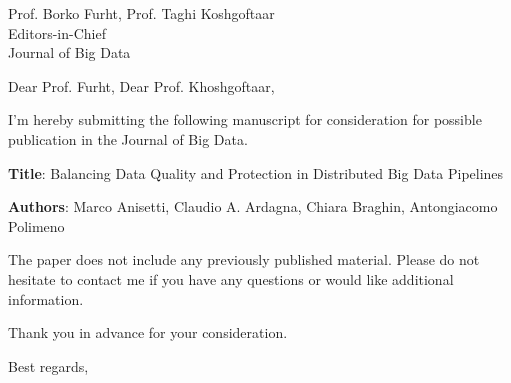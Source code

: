 \documentclass[12pt]{sriletter}
\begin{document}
\signature{\vspace*{-1.4cm}\\
    Claudio Ardagna}

\faxnumber{}

\begin{letter}{%
        Prof. Borko Furht, Prof.  Taghi Koshgoftaar \\
        Editors-in-Chief\\
        Journal of Big Data\\
    }

    \opening{Dear Prof. Furht, Dear Prof. Khoshgoftaar,}

    I'm hereby submitting the following manuscript for consideration for possible publication in the Journal of Big Data.

    \textbf{Title}: Balancing Data Quality and Protection in Distributed Big Data Pipelines

    \textbf{Authors}: Marco Anisetti, Claudio A. Ardagna, Chiara Braghin, Antongiacomo Polimeno

    The paper does not include any previously published material. Please do not hesitate to contact me if you have any questions or would like additional information.

    Thank you in advance for your consideration.

    \closing{Best regards,}

\end{letter}
\end{document}
